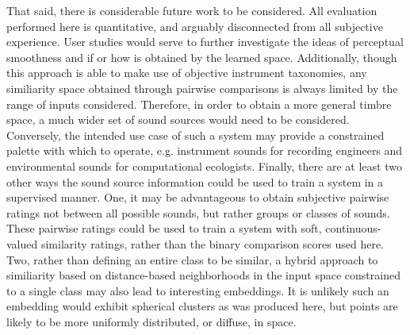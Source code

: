 That said, there is considerable future work to be considered.
All evaluation performed here is quantitative, and arguably disconnected from all subjective experience.
User studies would serve to further investigate the ideas of perceptual smoothness and if or how is obtained by the learned space.
Additionally, though this approach is able to make use of objective instrument taxonomies, any similiarity space obtained through pairwise comparisons is always limited by the range of inputs considered.
Therefore, in order to obtain a more general timbre space, a much wider set of sound sources would need to be considered.
Conversely, the intended use case of such a system may provide a constrained palette with which to operate, e.g. instrument sounds for recording engineers and environmental sounds for computational ecologists.
Finally, there are at least two other ways the sound source information could be used to train a system in a supervised manner.
One, it may be advantageous to obtain subjective pairwise ratings not between all possible sounds, but rather groups or classes of sounds.
These pairwise ratings could be used to train a system with soft, continuous-valued similarity ratings, rather than the binary comparison scores used here.
Two, rather than defining an entire class to be similar, a hybrid approach to similiarity based on distance-based neighborhoods in the input space constrained to a single class may also lead to interesting embeddings.
It is unlikely such an embedding would exhibit spherical clusters as was produced here, but points are likely to be more uniformly distributed, or diffuse, in space.








